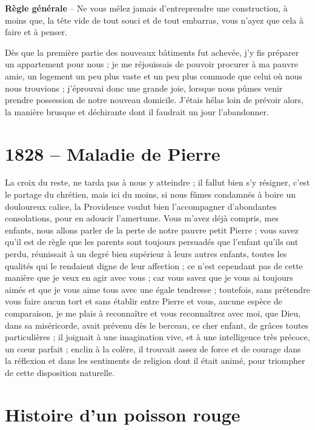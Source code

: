 \documentclass[11pt,a4paper]{report}
\begin{document}
\begin{center}
\textbf{Règle générale} -- Ne vous mêlez jamais d'entreprendre une construction, à moins que, la tête vide de tout souci et de tout embarras, vous n'ayez que cela à faire et à penser.
\end{center}

Dès que la première partie des nouveaux bâtiments fut achevée, j'y fis préparer un appartement pour nous ; je me réjouissais de pouvoir procurer à ma pauvre amie, un logement un peu plus vaste et un peu plus commode que celui où nous nous trouvions ; j'éprouvai donc une grande joie, lorsque nous pûmes venir prendre possession de notre nouveau domicile. J'étais hélas loin de prévoir alors, la manière brusque et déchirante dont il faudrait un jour l'abandonner.

\section*{1828 -- Maladie de Pierre}

La croix du reste, ne tarda pas à nous y atteindre ; il fallut bien s'y résigner, c'est le partage du chrétien, mais ici du moins, si nous fûmes condamnés à boire un douloureux calice, la Providence voulut bien l'accompagner d'abondantes consolations, pour en adoucir l'amertume. Vous m'avez déjà compris, mes enfants, nous allons parler de la perte de notre pauvre petit Pierre ; vous savez qu'il est de règle que les parents sont toujours persuadés que l'enfant qu'ils ont perdu, réunissait à un degré bien supérieur à leurs autres enfants, toutes les qualités qui le rendaient digne de leur affection ; ce n'est cependant pas de cette manière que je veux en agir avec vous ; car vous savez que je vous ai toujours aimés et que je vous aime tous avec une égale tendresse ; toutefois, sans prétendre vous faire aucun tort et sans établir entre Pierre et vous, aucune espèce de comparaison, je me plais à reconnaître et vous reconnaîtrez avec moi, que Dieu, dans sa miséricorde, avait prévenu dès le berceau, ce cher enfant, de grâces toutes particulières ; il joignait à une imagination vive, et à une intelligence très précoce, un cœur parfait ; enclin à la colère, il trouvait assez de force et de courage dans la réflexion et dans les sentiments de religion dont il était animé, pour triompher de cette disposition naturelle.

\section*{Histoire d'un poisson rouge}
\end{document}
